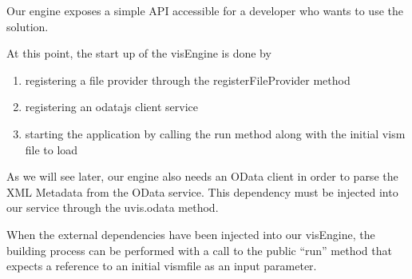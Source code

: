 Our engine exposes a simple API accessible for a developer who wants to use the solution.

At this point, the start up of the visEngine is done by 
\begin{enumerate}
    \item registering a file provider through the registerFileProvider method
    \item registering an odatajs client service
    \item starting the application by calling the run method along with the initial vism file to load
\end{enumerate}




As we will see later, our engine also needs an OData client in order to parse the XML Metadata from the OData service. This dependency must be injected into our service through the uvis.odata method.

When the external dependencies have been injected into our visEngine, the building process can be performed with a call to the public ``run'' method that expects a reference to an initial vismfile as an input parameter.